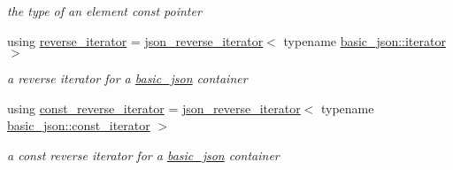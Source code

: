 \begin{DoxyCompactItemize}
\begin{DoxyCompactList}\small\item\em the type of an element const pointer \end{DoxyCompactList}\item 
\hypertarget{classnlohmann_1_1basic__json_a2f1f83aa187a56dc5ec7a7027065ac8a}{}\label{classnlohmann_1_1basic__json_a2f1f83aa187a56dc5ec7a7027065ac8a} 
using \hyperlink{classnlohmann_1_1basic__json_a2f1f83aa187a56dc5ec7a7027065ac8a}{reverse\+\_\+iterator} = \hyperlink{classnlohmann_1_1basic__json_1_1json__reverse__iterator}{json\+\_\+reverse\+\_\+iterator}$<$ typename \hyperlink{classnlohmann_1_1basic__json_1_1iterator}{basic\+\_\+json\+::iterator} $>$
\begin{DoxyCompactList}\small\item\em a reverse iterator for a \hyperlink{classnlohmann_1_1basic__json}{basic\+\_\+json} container \end{DoxyCompactList}\item 
\hypertarget{classnlohmann_1_1basic__json_ae336fff01f4b78e3e16e5008dc8dbc00}{}\label{classnlohmann_1_1basic__json_ae336fff01f4b78e3e16e5008dc8dbc00} 
using \hyperlink{classnlohmann_1_1basic__json_ae336fff01f4b78e3e16e5008dc8dbc00}{const\+\_\+reverse\+\_\+iterator} = \hyperlink{classnlohmann_1_1basic__json_1_1json__reverse__iterator}{json\+\_\+reverse\+\_\+iterator}$<$ typename \hyperlink{classnlohmann_1_1basic__json_1_1const__iterator}{basic\+\_\+json\+::const\+\_\+iterator} $>$
\begin{DoxyCompactList}\small\item\em a const reverse iterator for a \hyperlink{classnlohmann_1_1basic__json}{basic\+\_\+json} container \end{DoxyCompactList}\end{DoxyCompactItemize}
